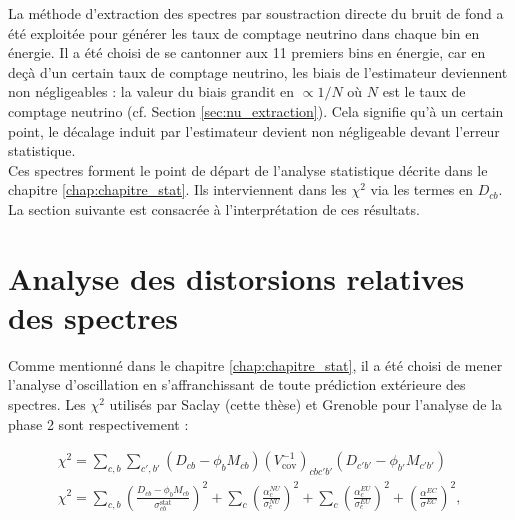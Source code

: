 
La méthode d'extraction des spectres par soustraction directe du bruit de fond a été exploitée pour générer les taux de comptage neutrino dans chaque bin en énergie. Il a été choisi de se cantonner aux 11 premiers bins en énergie, car en deçà d'un certain taux de comptage neutrino, les biais de l'estimateur deviennent non négligeables : la valeur du biais grandit en $\propto 1/N$ où $N$ est le taux de comptage neutrino (cf. Section \ref{sec:nu_extraction}). Cela signifie qu'à un certain point, le décalage induit par l'estimateur devient non négligeable devant l'erreur statistique.\\

Ces spectres forment le point de départ de l'analyse statistique décrite dans le chapitre \ref{chap:chapitre_stat}. Ils interviennent dans les $\chi^2$ via les termes en $D_{cb}$. La section suivante est consacrée à l'interprétation de ces résultats.


\bigbreak

\section{Analyse des distorsions relatives des spectres}

Comme mentionné dans le chapitre \ref{chap:chapitre_stat}, il a été choisi de mener l'analyse d'oscillation en s'affranchissant de toute prédiction extérieure des spectres. Les $\chi^2$ utilisés par Saclay (cette thèse) et Grenoble pour l'analyse de la phase 2 sont respectivement :

\begin{equation}
    \begin{gathered}
        \chi^2 = \sum_{c,b} \sum_{c',b'} \left(D_{cb} - \phi_{b} M_{cb}\right) \left(V^{-1}_\textrm{cov}\right)_{cbc'b'} \left(D_{c'b'} - \phi_{b'} M_{c'b'}\right)\\
        \chi^2 = \sum_{c,b} \left(\frac{D_{cb} - \phi_{b} M_{cb}}{\sigma^\textrm{stat}_{cb}}\right)^2 + \sum_c \left( \frac{\alpha^{NU}_c}{\sigma^{NU}_c} \right)^2 + \sum_c \left( \frac{\alpha^{EU}_c}{\sigma^{EU}_c} \right)^2 + \left( \frac{\alpha^{EC}}{\sigma^{EC}} \right)^2,
    \end{gathered}
\end{equation}

